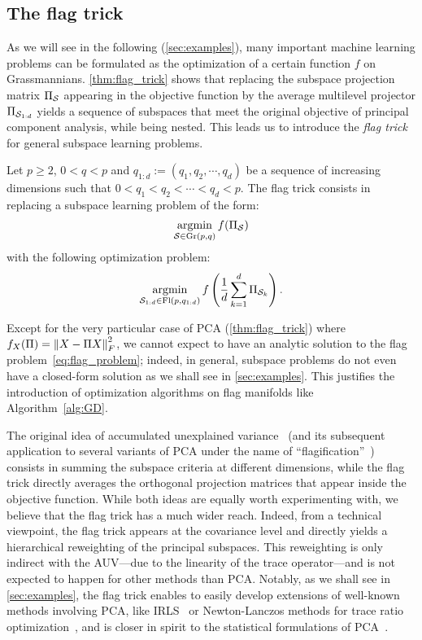 \subsection{The flag trick}
As we will see in the following (\autoref{sec:examples}), many important machine learning problems can be formulated as the optimization of a certain function $f$ on Grassmannians.
\autoref{thm:flag_trick} shows that replacing the subspace projection matrix $\Pi_{\S}$ appearing in the objective function by the average multilevel projector $\Pi_{\Sf}$ yields a sequence of subspaces that meet the original objective of principal component analysis, while being nested.
This leads us to introduce the \textit{flag trick} for general subspace learning problems.
\begin{definition}\label{def:flag_trick}
Let $p \geq 2$, $0 < q < p$ and $q_{1:d} := (q_1, q_2 ,\cdots, q_d)$ be a sequence of increasing dimensions such that $0 < q_1 < q_2 < \cdots < q_d < p$.
The flag trick consists in replacing a subspace learning problem of the form:
\begin{equation}\label{eq:subspace_problem}
    \argmin{\S \in \Gr(p, q)} f(\Pi_\S)
\end{equation}
with the following optimization problem:
\begin{equation}\label{eq:flag_problem}
    \argmin{\S_{1:d} \in \Fl(p, q_{1:d})} f\lrp{\frac 1 d \sum_{k=1}^d \Pi_{\S_k}}.
\end{equation}
\end{definition}
Except for the very particular case of PCA (\autoref{thm:flag_trick}) where $f_X(\Pi) = \norm{X - \Pi X}_F^2$, we cannot expect to have an analytic solution to the flag problem~\eqref{eq:flag_problem}; indeed, in general, subspace problems do not even have a closed-form solution as we shall see in \autoref{sec:examples}. This justifies the introduction of optimization algorithms on flag manifolds like Algorithm~\ref{alg:GD}. 

\begin{remark}
The original idea of accumulated unexplained variance~\citep{pennec_barycentric_2018} (and its subsequent application to several variants of PCA under the name of ``flagification''~\citep{mankovich_fun_2024}) consists in summing the subspace criteria at different dimensions, while the flag trick directly averages the orthogonal projection matrices that appear inside the objective function.
While both ideas are equally worth experimenting with, we believe that the flag trick has a much wider reach. Indeed, from a technical viewpoint, the flag trick appears at the covariance level and directly yields a hierarchical reweighting of the principal subspaces. This reweighting is only indirect with the AUV---due to the linearity of the trace operator---and is not expected to happen for other methods than PCA. Notably, as we shall see in \autoref{sec:examples}, the flag trick enables to easily develop extensions of well-known methods involving PCA, like IRLS~\citep{lerman_fast_2018} or Newton-Lanczos methods for trace ratio optimization~\citep{ngo_trace_2012}, and is closer in spirit to the statistical formulations of PCA~\citep{szwagier_curse_2024}.
\end{remark}



